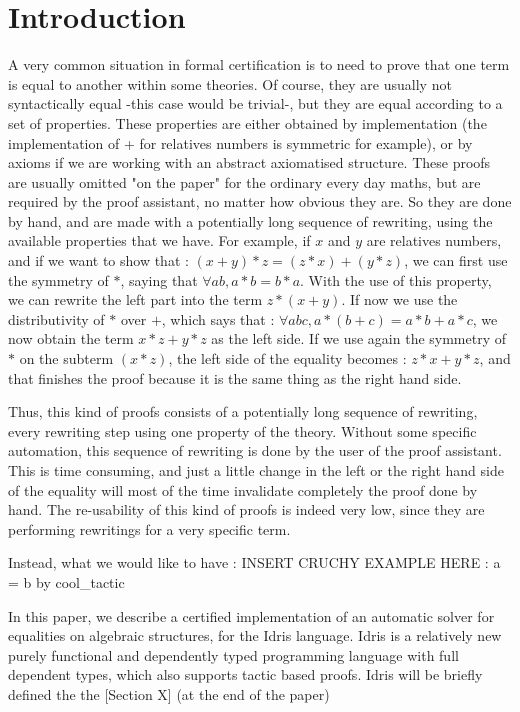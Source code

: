 \section{Introduction}


A very common situation in formal certification is to need to prove that one term is equal to another within some theories. Of course, they are usually not syntactically equal -this case would be trivial-, but they are equal according to a set of properties. These properties are either obtained by implementation (the implementation of + for relatives numbers is symmetric for example), or by axioms if we are working with an abstract axiomatised structure. 
These proofs are usually omitted "on the paper" for the ordinary every day maths, but are required by the proof assistant,  no matter how obvious they are. So they are done by hand, and are made with a potentially long sequence of rewriting, using the available properties that we have. For example, if $x$ and $y$ are relatives numbers, and if we want to show that :
$(x + y) * z = (z * x) + (y * z)$, we can first use the symmetry of $*$, saying that
$\forall a b, a * b = b * a$.
With the use of this property, we can rewrite the left part into the term $z * (x + y)$.
If now we use the distributivity of $*$ over $+$, which says that :
$\forall a b c, a * (b+c) = a*b + a*c$,
we now obtain the term $x*z + y*z$ as the left side.
If we use again the symmetry of $*$ on the subterm $(x*z)$, the left side of the equality becomes : $z*x + y*z$, and that finishes the proof because it is the same thing as the right hand side.

Thus, this kind of proofs consists of a potentially long sequence of rewriting, every rewriting step using one property of the theory. Without some specific automation, this sequence of rewriting is done by the user of the proof assistant. This is time consuming, and just a little change in the left or the right hand side of the equality will most of the time invalidate completely the proof done by hand. The re-usability of this kind of proofs is indeed very low, since they are performing rewritings for a very specific term.

Instead, what we would like to have :
INSERT CRUCHY EXAMPLE HERE : 
a = b by cool\_tactic

In this paper, we describe a certified implementation of an automatic solver for equalities on algebraic structures, for the Idris language. Idris is a relatively new purely functional and dependently typed programming language with full dependent types, which also supports tactic based proofs. Idris will be briefly defined the the [Section X] (at the end of the paper)

